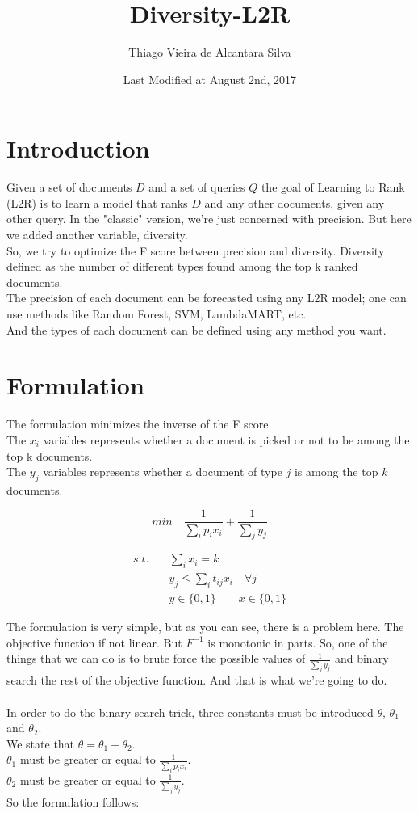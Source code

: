 \documentclass[11pt]{article}
\title{\textbf{Diversity-L2R}}
\author{Thiago Vieira de Alcantara Silva}
\date{Last Modified at August 2nd, 2017}
\begin{document}
\maketitle

\section{Introduction}

Given a set of documents $D$ and a set of queries $Q$ the goal of Learning to Rank (L2R) is to learn a model that ranks $D$ and any other documents, given any other query. In the "classic" version, we're just concerned with precision. But here we added another variable, diversity.\\
So, we try to optimize the F score between precision and diversity. Diversity defined as the number of different types found among the top k ranked documents.\\
The precision of each document can be forecasted using any L2R model; one can use methods like Random Forest, SVM, LambdaMART, etc.\\
And the types of each document can be defined using any method you want.

\section{Formulation}
The formulation minimizes the inverse of the F score.\\
The $x_i$ variables represents whether a document is picked or not to be among the top k documents.\\
The $y_j$ variables represents whether a document of type $j$ is among the top $k$ documents.

$$min \quad \frac{1}{\sum_i{p_ix_i}} + \frac{1}{\sum_j{y_j}}$$

\begin{align*}
s.t. \quad &\sum_i{x_i} = k\\
           &y_j \leq \sum_i{t_{ij}x_i} \quad \forall j\\
           &y \in \{0, 1\} \qquad x \in \{0, 1\}
\end{align*}

The formulation is very simple, but as you can see, there is a problem here.
The objective function if not linear. But $F^{-1}$ is monotonic in parts. So, one of the things that we can do is to brute force the possible values of $\frac{1}{\sum_j{y_j}}$ and binary search the rest of the objective function. And that is what we're going to do.\\\\
In order to do the binary search trick, three constants must be introduced $\theta$, $\theta_1$ and $\theta_2$.\\
We state that $\theta = \theta_1 + \theta_2$.\\
$\theta_1$ must be greater or equal to $\frac{1}{\sum_i{p_ix_i}}$.\\
$\theta_2$ must be greater or equal to $\frac{1}{\sum_j{y_j}}$.\\
So the formulation follows:
\end{document}
